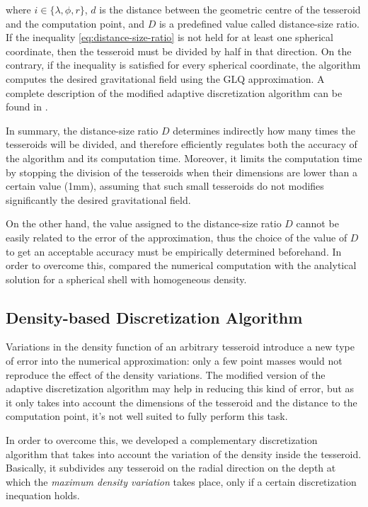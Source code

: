 \documentclass[extra]{gji}
\begin{document}
\noindent where $i \in \{\lambda, \phi, r\}$, $d$ is the distance
between the geometric centre of the tesseroid and the computation
point, and $D$ is a predefined value called distance-size ratio.
If the inequality \ref{eq:distance-size-ratio} is not held for at least
one spherical coordinate, then the tesseroid must be divided by half in
that direction.
On the contrary, if the inequality is satisfied for every spherical
coordinate, the algorithm computes the desired gravitational field using the
GLQ approximation.
A complete description of the modified adaptive discretization
algorithm can be found in \citet{Uieda2016}.

In summary, the distance-size ratio $D$ determines indirectly how many
times the tesseroids will be divided, and therefore efficiently
regulates both the accuracy of the algorithm and its computation time.
Moreover, it limits the computation time by stopping the division of
the tesseroids when their dimensions are lower than a certain value
(1mm), assuming that such small tesseroids do not modifies
significantly the desired gravitational field.

On the other hand, the value assigned to the distance-size ratio $D$
cannot be easily related to the error of the approximation, thus the
choice of the value of $D$ to get an acceptable accuracy must be
empirically determined beforehand.
In order to overcome this, \citet{Uieda2016} compared the numerical
computation with the analytical solution for a spherical shell with
homogeneous density.


\subsection{Density-based Discretization Algorithm}

Variations in the density function of an arbitrary tesseroid introduce
a new type of error into the numerical approximation: only a few point
masses would not reproduce the effect of the density variations.
The modified version of the adaptive discretization algorithm may help
in reducing this kind of error, but as it only takes into account the
dimensions of the tesseroid and the distance to the computation point,
it's not well suited to fully perform this task.

In order to overcome this, we developed a complementary discretization
algorithm that takes into account the variation of the density inside
the tesseroid.
Basically, it subdivides any tesseroid on the radial direction on the
depth at which the \emph{maximum density variation} takes place, only
if a certain discretization inequation holds.
\end{document}
